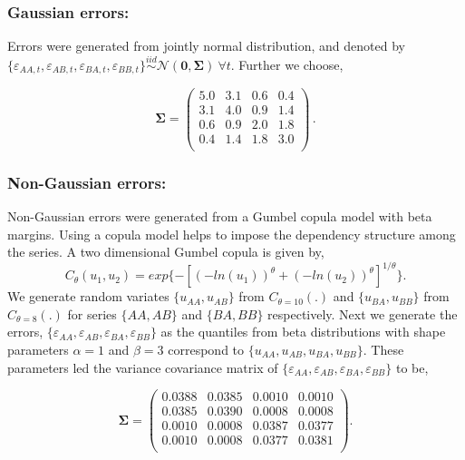 \documentclass[12pt]{article}
\theoremstyle{definition}
\begin{document}
\subsubsection*{Gaussian errors:}

Errors were generated from jointly normal distribution, and denoted by $\{\varepsilon_{AA,t},\varepsilon_{AB,t},\varepsilon_{BA,t},\varepsilon_{BB,t}\} \overset{iid}{\sim} \mathcal{N}(\bm{0}, \bm{\Sigma})~\forall t$. Further we choose, 


\begin{equation}\label{eq:SigmaGaussian}
\bm{\Sigma} =
\begin{pmatrix}
5.0 & 3.1 & 0.6 & 0.4 \\
3.1 & 4.0 & 0.9 & 1.4 \\
0.6 & 0.9 & 2.0 & 1.8 \\
0.4 & 1.4 & 1.8 & 3.0 \\
\end{pmatrix}\,.
\end{equation}


\subsubsection*{Non-Gaussian errors:}

Non-Gaussian errors were generated from a Gumbel copula model with beta margins. Using a copula model helps to impose the dependency structure among the series. A two dimensional Gumbel copula is given by, 
\begin{equation*}
C_\theta(u_1, u_2) = exp\{-[(-ln(u_1))^\theta + (-ln(u_2))^\theta]^{1/\theta}\}. 
\end{equation*}
We generate random variates $\{u_{AA}, u_{AB}\}$ from $C_{\theta=10}(.)$ and $\{u_{BA}, u_{BB}\}$ from $C_{\theta=8}(.)$ for series $\{AA, AB\}$ and $\{BA, BB\}$ respectively. Next we generate the errors, $\{\varepsilon_{AA}, \varepsilon_{AB}, \varepsilon_{BA}, \varepsilon_{BB}\}$ as the quantiles from beta distributions with shape parameters $\alpha = 1$ and $\beta = 3$ correspond to $\{u_{AA}, u_{AB}, u_{BA}, u_{BB}\}$. These parameters led the variance covariance matrix of $\{\varepsilon_{AA}, \varepsilon_{AB}, \varepsilon_{BA}, \varepsilon_{BB}\}$ to be,

\begin{equation} \label{eq:SigmaNonGauss}
\bm{\Sigma} = \begin{pmatrix}
0.0388 & 0.0385 & 0.0010 & 0.0010\\
0.0385 & 0.0390 & 0.0008 & 0.0008 \\
0.0010 & 0.0008 & 0.0387 & 0.0377 \\
0.0010 & 0.0008 & 0.0377 & 0.0381 \\
\end{pmatrix}.
\end{equation}
 
\end{document}

